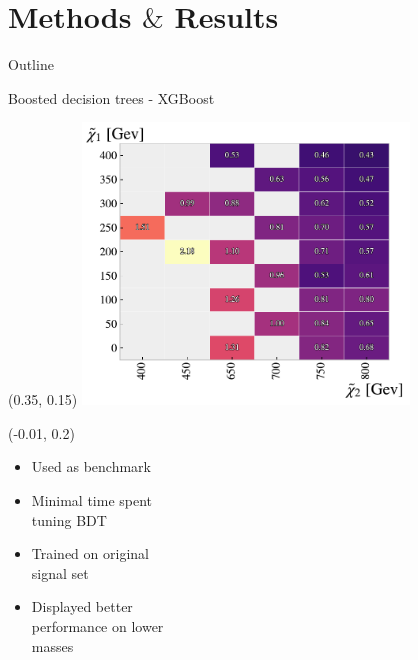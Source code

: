 \documentclass[UKenglish]{beamer}
\begin{document}
\section{Methods $\&$ Results}
\begin{frame}{Outline}
    \tableofcontents[currentsection]
\end{frame}


\begin{frame}{Boosted decision trees - XGBoost}
    \begin{textblock}{1}(0.35, 0.15)
        \includegraphics[width=0.65\textwidth]{figures/grids/XGBGridSig.pdf}    
    \end{textblock}
    \begin{textblock}{1}(-0.01, 0.2)
        \begin{itemize}
            \item Used as benchmark
            \item Minimal time spent\\ tuning BDT
            \item Trained on original \\ signal set
            \item Displayed better\\ performance on lower \\masses  
        \end{itemize}
    \end{textblock}
\end{frame}

\end{document}
